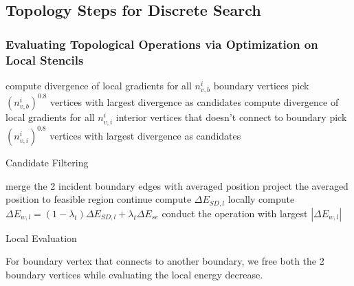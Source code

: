 
\subsection{Topology Steps for Discrete Search}
\label{sec:topologyStep}

\subsubsection{Evaluating Topological Operations via Optimization on Local Stencils}

\begin{algorithm}[h]
\SetAlgoLined
{}
{
  compute divergence of local gradients for all $n_{v,b}^i$ boundary vertices\;
  pick $(n_{v,b}^i)^{0.8}$ vertices with largest divergence as candidates\;
}
{
  compute divergence of local gradients for all $n_{v,i}^i$ interior vertices that doesn't connect to boundary\;
  pick $(n_{v,i}^i)^{0.8}$ vertices with largest divergence as candidates\;
}
\caption{Candidate Filtering}
\end{algorithm}

\begin{algorithm}[h]
\SetAlgoLined
{}
{
  {
    merge the 2 incident boundary edges with averaged position\;
    {
      project the averaged position to feasible region\;
      {
        continue\;
      }
    }
    compute $\Delta E_{SD,l}$ locally\;
    compute $\Delta E_{w,l} = (1-\lambda_t)\Delta E_{SD,l}+\lambda_t \Delta E_{se}$
  }
}
conduct the operation with largest $|\Delta E_{w,l}|$
\caption{Local Evaluation}
\end{algorithm}
For boundary vertex that connects to another boundary, we free both the 2 boundary vertices while evaluating the local energy decrease.

